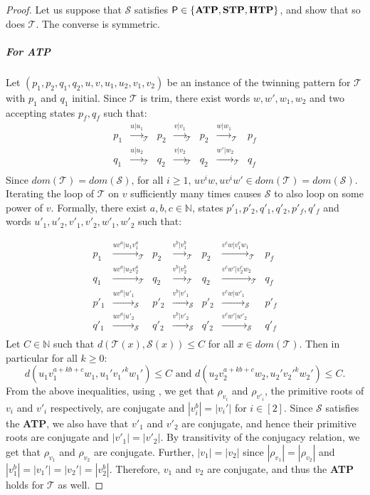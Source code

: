 \documentclass[a4paper,UKenglish,cleveref, autoref, thm-restate,authorcolumns, colorlinks]{lipics-v2021}
\newcommand\dom{\mathit{dom}}
\newcommand{\trans}{\mathcal{T}}
\newcommand{\transs}{\mathcal{S}}
\newcommand{\ATP}[0]{\textbf{ATP}}
\newcommand{\STP}[0]{\textbf{STP}}
\newcommand{\HTP}[0]{\textbf{HTP}}
\begin{document}
\begin{proof}
    Let us suppose that $\transs$ satisfies ${\sf P}\in \{\ATP,\STP, \HTP\}$, and show that so does $\trans$. The converse is symmetric. 
    \subparagraph*{For \ATP{}}  Let $(p_1,p_2,q_1,q_2,u,v,u_1,u_2,v_1,v_2)$ be an instance of the twinning pattern
    for $\trans$ with $p_1$ and $q_1$ initial.
    Since  $\trans$ is trim,
    there exist words $w,w',w_1,w_2$ and two accepting states $p_f,q_f$ such that:
    $$
    \begin{array}{llllllllllll}
    p_1 & \xrightarrow{u|u_1}_\trans & p_2 & \xrightarrow{v|v_1}_\trans & p_2 &  \xrightarrow{w|w_1}_\trans & p_f \\
q_1 & \xrightarrow{u|u_2}_\trans & q_2 & \xrightarrow{v|v_2}_\trans & q_2 &  \xrightarrow{w'|w_2}_\trans & q_f \\    
    \end{array}
    $$
Since $\dom(\trans) = \dom(\transs)$,
for all $i\geq 1$, $uv^iw,uv^iw' \in \dom(\trans) = \dom(\transs)$.
Iterating the loop of $\trans$ on $v$ sufficiently many times
causes $\transs$ to also loop on some power of $v$.
Formally, there exist $a,b,c\in\mathbb{N}$,
states $p'_1,p'_2,q'_1,q'_2,p'_f,q'_f$
and words $u'_1,u'_2,v'_1,v'_2,w'_1,w'_2$ such that:

   $$
    \begin{array}{llllllllllll}
    p_1 & \xrightarrow{uv^{a}|u_1v_1^{a}}_\trans & p_2 & \xrightarrow{v^b|v_1^b}_\trans & p_2 &  \xrightarrow{v^cw|v_1^cw_1}_\trans & p_f \\
q_1 & \xrightarrow{uv^{a}|u_2v_2^{a}}_\trans & q_2 & \xrightarrow{v^b|v_2^b}_\trans & q_2 &  \xrightarrow{v^cw'|v_2^cw_2}_\trans & q_f \\    

    p'_1 & \xrightarrow{uv^{a}|u'_1}_\transs & p'_2 & \xrightarrow{v^b|v'_1}_\transs & p'_2 &  \xrightarrow{v^cw|w'_1}_\transs & p'_f \\
q'_1 & \xrightarrow{uv^{a}|u'_2}_\transs & q'_2 & \xrightarrow{v^b|v'_2}_\transs & q'_2 &  \xrightarrow{v^cw'|w'_2}_\transs & q'_f \\    
    \end{array}
    $$
Let $C \in \mathbb{N}$
such that $d(\trans(x),\transs(x)) \leq C$ for all $x \in \dom(\trans)$.
Then in particular for all $k\geq 0$: 
$$
d(u_1v_1^{a+kb+c}w_1,u_1'v_1'^kw_1')\leq C\text{ and }d(u_2v_2^{a+kb+c}w_2,u_2'v_2'^kw_2')\leq C.
$$
From the above inequalities, using ,
we get that $\rho_{v_i}$ and $\rho_{v'_i}$, the primitive roots of $v_i$ and $v'_i$ respectively, are conjugate and $|v_i^{b}| = |v_i'|$ for $i \in [2]$.
Since $\transs$ satisfies the \ATP{},
we also have that $v'_1$ and $v'_2$ are conjugate, and hence their primitive roots are conjugate and $|v'_1| = |v'_2|$.
By transitivity of the conjugacy relation,
we get that $\rho_{v_1}$ and $\rho_{v_2}$ are conjugate. Further, $|v_1| = |v_2|$ since $|\rho_{v_1}| = |\rho_{v_2}|$ and $|v_1^b| = |v_1'| = |v_2'| =|v_2^b|$. Therefore, $v_1$ and $v_2$ are conjugate, and
thus the \ATP{} holds for $\trans$ as well. 



\end{proof}
\end{document}
